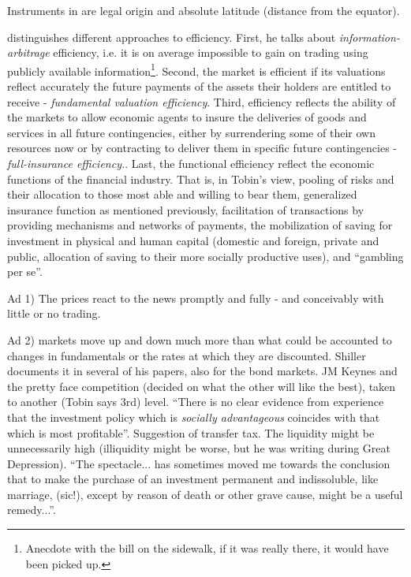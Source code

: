 \documentclass[a4paper,11pt]{article}
\begin{document}
Instruments in \textcite{edisonetal2002} are legal origin and absolute latitude (distance from the equator).

\textbf{\textcite{Tobin1984}} distinguishes different approaches to efficiency. First, he talks about \textit{information-arbitrage} efficiency, i.e. it is on average impossible to gain on trading using publicly available information\footnote{Anecdote with the bill on the sidewalk, if it was really there, it would have been picked up.}. Second, the market is efficient if its valuations reflect accurately the future payments of the assets their holders are entitled to receive - \textit{fundamental valuation efficiency}. Third, efficiency reflects the ability of the markets to allow economic agents to insure the deliveries of goods and services in all future contingencies, either by surrendering some of their own resources now or by contracting to deliver them in specific future contingencies - \textit{full-insurance efficiency.}. Last, the functional efficiency reflect the economic functions of the financial industry. That is, in Tobin's view, pooling  of risks and their allocation to those most able and willing to bear them, generalized insurance function as mentioned previously, facilitation of transactions by providing mechanisms and networks of payments, the mobilization of saving for investment in physical and human capital (domestic and foreign, private and public, allocation of saving to their more socially productive uses), and ``gambling per se''.

Ad 1) The prices react to the news promptly and fully - and conceivably with little or no trading.

Ad 2) markets move up and down much more than what could be accounted to changes in fundamentals or the rates at which they are discounted. Shiller documents it in several of his papers, also for the bond markets.
JM Keynes and the pretty face competition (decided on what the other will like the best), taken to another (Tobin says 3rd) level. ``There is no clear evidence from experience that the investment policy which is \textit{socially advantageous} coincides with that which is most profitable''. Suggestion of transfer tax. The liquidity might be unnecessarily high (illiquidity might be worse, but he was writing during Great Depression). ``The spectacle... has sometimes moved me towards the conclusion that to make the purchase of an investment permanent and indissoluble, like marriage, (sic!), except by reason of death or other grave cause, might be a useful remedy...''.
\end{document}
